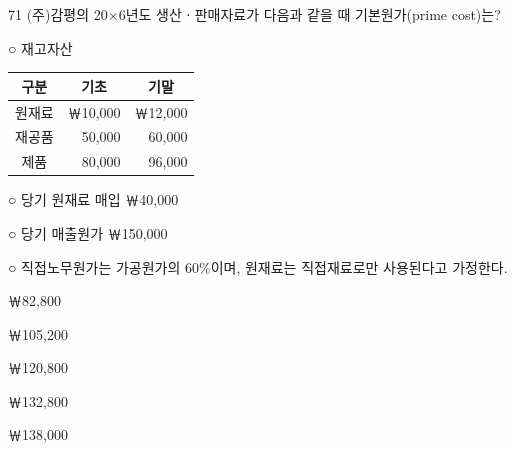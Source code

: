 \begin{question}{71}
(주)감평의 20×6년도 생산ㆍ판매자료가 다음과 같을 때 기본원가(prime cost)는?
\begin{framedtext}
○ 재고자산 \par
\smallskip

{\small\centering\begin{tabular}{|c|r|r|}\hline
구분 & \multicolumn{1}{c|}{기초} & \multicolumn{1}{c|}{기말} \\ \hline
원재료 & ￦10,000 & ￦12,000 \\ \hline
재공품 & 50,000 & 60,000 \\ \hline
제품 & 80,000 & 96,000 \\ \hline
\end{tabular}\par}
\smallskip
○ 당기 원재료 매입 ￦40,000 \par
○ 당기 매출원가 ￦150,000 \par
○ 직접노무원가는 가공원가의 60\%이며, 원재료는 직접재료로만 사용된다고 가정한다. \par
\end{framedtext}
\begin{choices}
  \item ￦82,800
  \item ￦105,200
  \item ￦120,800
  \item ￦132,800
  \item ￦138,000
\end{choices}
\end{question}
